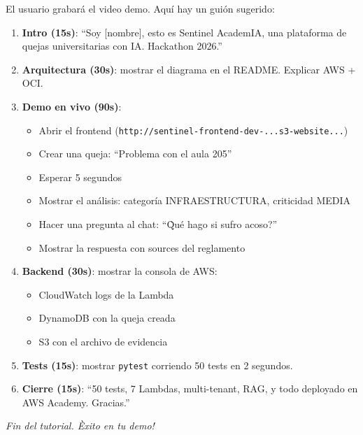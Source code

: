 \documentclass[11pt,a4paper,oneside]{article}
\begin{document}
El usuario grabar\'a el video demo. Aqu\'i hay un gui\'on sugerido:

\begin{enumerate}
  \item \textbf{Intro (15s)}: ``Soy [nombre], esto es Sentinel AcademIA, una plataforma
        de quejas universitarias con IA. Hackathon 2026.''
  \item \textbf{Arquitectura (30s)}: mostrar el diagrama en el README.
        Explicar AWS + OCI.
  \item \textbf{Demo en vivo (90s)}:
    \begin{itemize}
      \item Abrir el frontend (\texttt{http://sentinel-frontend-dev-...s3-website...})
      \item Crear una queja: ``Problema con el aula 205''
      \item Esperar 5 segundos
      \item Mostrar el an\'alisis: categor\'ia INFRAESTRUCTURA, criticidad MEDIA
      \item Hacer una pregunta al chat: ``\`Qu\'e hago si sufro acoso?''
      \item Mostrar la respuesta con sources del reglamento
    \end{itemize}
  \item \textbf{Backend (30s)}: mostrar la consola de AWS:
    \begin{itemize}
      \item CloudWatch logs de la Lambda
      \item DynamoDB con la queja creada
      \item S3 con el archivo de evidencia
    \end{itemize}
  \item \textbf{Tests (15s)}: mostrar \texttt{pytest} corriendo 50 tests en 2 segundos.
  \item \textbf{Cierre (15s)}: ``50 tests, 7 Lambdas, multi-tenant, RAG, y todo deployado
        en AWS Academy. Gracias.''
\end{enumerate}

\vspace{2em}
\begin{center}
\textit{Fin del tutorial. \`Exito en tu demo!}
\end{center}
\end{document}
